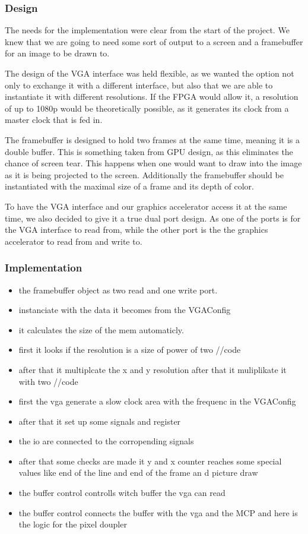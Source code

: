 \subsubsection*{Design}
The needs for the implementation were clear from the start of the project. We knew that we are going to need some sort of output to a screen and a framebuffer for an image to be drawn to.

The design of the VGA interface was held flexible, as we wanted the option not only to exchange it with a different interface, but also that we are able to instantiate it with different resolutions. If the FPGA would allow it, a resolution of up to 1080p would be theoretically possible, as it generates its clock from a master clock that is fed in.

The framebuffer is designed to hold two frames at the same time, meaning it is a double buffer. This is something taken from GPU design, as this eliminates the chance of screen tear. This happens when one would want to draw into the image as it is being projected to the screen. Additionally the framebuffer should be instantiated with the maximal size of a frame and its depth of color.

To have the VGA interface and our graphics accelerator access it at the same time, we also decided to give it a true dual port design. As one of the ports is for the VGA interface to read from, while the other port is the the graphics accelerator to read from and write to.
\subsubsection*{Implementation}
\begin{itemize}
	\item the framebuffer object as two read and one write port. 
	\item instanciate with the data it becomes from the VGAConfig
	\item it calculates the size of the mem automaticly. 
	\item first it looks if the resolution is a size of power of two  //code
	\item after that it multiplcate the x and y resolution after that it muliplikate it with two //code
	\item first the vga generate a slow clock area with the frequenc in the VGAConfig
	\item after that it set up some signals and register
	\item the io are connected to the corropending signals
	\item after that some checks are made it y and x counter reaches some special values like end of the line and end of the frame an d picture draw
	\item the buffer control controlls witch buffer the vga can read
	\item the buffer control connects the buffer with the vga and the MCP and here is the logic for the pixel doupler
\end{itemize}